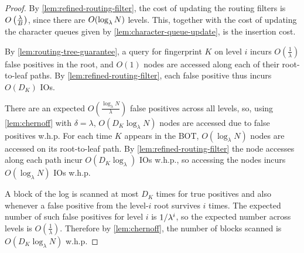 \begin{proof}
	By \cref{lem:refined-routing-filter}, the cost of updating the routing
	filters is $O\left(\frac{\lambda}{B}\right)$, since there are $O(\log_\lambda
	N)$ levels. This, together with the cost of updating the character queues
	given by \cref{lem:character-queue-update}, is the insertion cost.

	By \cref{lem:routing-tree-guarantee}, a query for fingerprint $K$ on level
	$i$ incurs $O\left(\frac{1}{\lambda}\right)$ false positives in the root,
	and $O(1)$ nodes are accessed along each of their root-to-leaf paths. By
	\cref{lem:refined-routing-filter}, each false positive thus incurs $O(D_K)$
	IOs.

	There are an expected $O\left(\frac{\log_\lambda N}{\lambda}\right)$ false
	positives across all levels, so, using \cref{lem:chernoff} with
	$\delta=\lambda$, $O(D_K\log_\lambda N)$ nodes are accessed due to false
	positives w.h.p. For each time $K$ appears in the BOT, $O(\log_\lambda N)$
	nodes are accessed on its root-to-leaf path. By
	\cref{lem:refined-routing-filter} the node accesses along each path incur
	$O(D_K\log_\lambda)$ IOs w.h.p., so accessing the nodes incurs
	$O(\log_\lambda N)$ IOs w.h.p.

	A block of the log is scanned at most $D_K$ times for true positives and
	also whenever a false positive from the level-$i$ root survives $i$ times.
	The expected number of such false positives for level $i$ is $1/\lambda^i$,
	so the expected number across levels is $O\left(\frac{1}{\lambda}\right)$.
	Therefore by \cref{lem:chernoff}, the number of blocks scanned is
	$O(D_K\log_\lambda N)$ w.h.p.
\end{proof}

